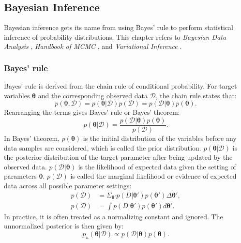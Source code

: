 \subsection{Bayesian Inference}
Bayesian inference gets its name from using Bayes' rule to perform statistical inference of probability distributions.
This chapter refers to \textit{Bayesian Data Analysis} \citep{gelman2013bayesian}, \textit{Handbook of MCMC} \citep{Allen_2007}, and \textit{Variational Inference} \citep{Blei_2017}.

\subsubsection{Bayes' rule}
Bayes' rule is derived from the chain rule of conditional probability. For target variables $\boldsymbol{\theta}$ and the corresponding observed data $\mathcal{D}$, the chain rule states that:
\begin{equation}
    p(\boldsymbol{\theta}, \mathcal{D}) = p(\boldsymbol{\theta}|\mathcal{D})p(\mathcal{D}) = p(\mathcal{D}|\boldsymbol{\theta})p(\boldsymbol{\theta}).
\end{equation}
Rearranging the terms gives Bayes' rule or Bayes' theorem:
\begin{equation}
\label{eq:bayes}
    p(\boldsymbol{\theta}|\mathcal{D})= \frac{p(\mathcal{D}|\boldsymbol{\theta})p(\boldsymbol{\theta})}{p(\mathcal{D})}.
\end{equation}
In Bayes' theorem, $p(\boldsymbol{\theta})$ is the initial distribution of the variables before any data samples are considered, which is called the prior distribution. $p(\boldsymbol{\theta}|\mathcal{D})$ is the posterior distribution of the target parameter after being updated by the observed data. $p(\mathcal{D}|\boldsymbol{\theta})$ is the likelihood of expected data given the setting of parameters $\boldsymbol{\theta}$. $p(\mathcal{D})$ is called the marginal likelihood or evidence of expected data across all possible parameter settings:
\begin{subequations}
    \begin{align}
    p(\mathcal{D}) &= \Sigma_{\boldsymbol{\theta}'}p(D|\boldsymbol{\theta}')p(\boldsymbol{\theta}')\Delta \boldsymbol{\theta}',\\
    p(\mathcal{D}) &= \int p(D|\boldsymbol{\theta}')p(\boldsymbol{\theta}')d\boldsymbol{\theta}'.
    \end{align}
\end{subequations}
In practice, it is often treated as a normalizing constant and ignored. The unnormalized posterior is then given by:
\begin{equation}
    p_u(\boldsymbol{\theta}|\mathcal{D}) \propto p(\mathcal{D}|\boldsymbol{\theta})p(\boldsymbol{\theta}).            
\end{equation}

